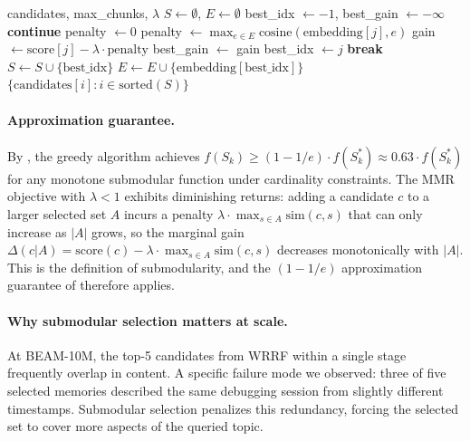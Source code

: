 \documentclass[11pt]{article}
\begin{document}
\begin{algorithm}[t]
\caption{Submodular coverage selection (Phase~1)}
\label{alg:submodular}
\begin{algorithmic}[1]
\REQUIRE candidates, max\_chunks, $\lambda$
\STATE $S \leftarrow \emptyset$, $E \leftarrow \emptyset$ 
  \STATE best\_idx $\leftarrow -1$, best\_gain $\leftarrow -\infty$
      \STATE \textbf{continue}
    \ENDIF
      \STATE penalty $\leftarrow 0$
    \ELSE
      \STATE penalty $\leftarrow \max_{e \in E} \text{cosine}(\text{embedding}[j], e)$
    \ENDIF
    \STATE gain $\leftarrow \text{score}[j] - \lambda \cdot \text{penalty}$
      \STATE best\_gain $\leftarrow$ gain
      \STATE best\_idx $\leftarrow j$
    \ENDIF
  \ENDFOR
    \STATE \textbf{break}
  \ENDIF
  \STATE $S \leftarrow S \cup \{\text{best\_idx}\}$
    \STATE $E \leftarrow E \cup \{\text{embedding}[\text{best\_idx}]\}$
  \ENDIF
\ENDFOR
\RETURN $\{\text{candidates}[i] : i \in \text{sorted}(S)\}$
\end{algorithmic}
\end{algorithm}

\paragraph{Approximation guarantee.}
By \citet{Krause2008}, the greedy algorithm achieves
$f(S_k) \geq (1 - 1/e) \cdot f(S_k^*) \approx 0.63 \cdot f(S_k^*)$
for any monotone submodular function under cardinality constraints.
The MMR objective with $\lambda < 1$ exhibits diminishing returns:
adding a candidate $c$ to a larger selected set $A$ incurs a
penalty $\lambda \cdot \max_{s \in A} \mathrm{sim}(c, s)$ that
can only increase as $|A|$ grows, so the marginal gain
$\Delta(c|A) = \mathrm{score}(c) - \lambda \cdot \max_{s \in A}
\mathrm{sim}(c, s)$ decreases monotonically with $|A|$.  This
is the definition of submodularity, and the $(1 - 1/e)$
approximation guarantee of \citet{Krause2008} therefore applies.

\paragraph{Why submodular selection matters at scale.}
At BEAM-10M, the top-5 candidates from WRRF within a single stage
frequently overlap in content.  A specific failure mode we observed:
three of five selected memories described the same debugging session
from slightly different timestamps.  Submodular selection penalizes
this redundancy, forcing the selected set to cover more aspects of
the queried topic.
\end{document}
